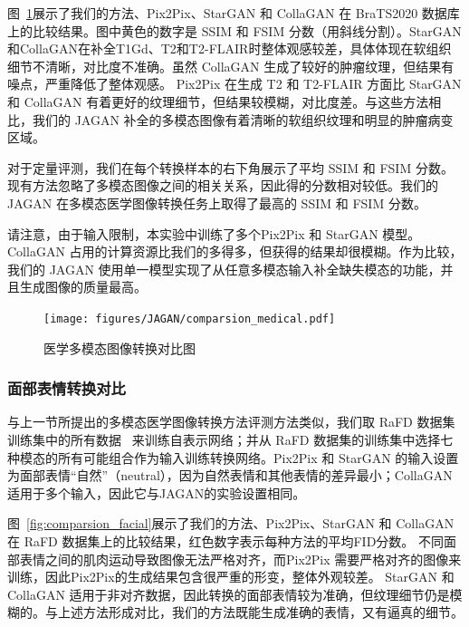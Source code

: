 图~\ref{fig:comparsion_medical}展示了我们的方法、Pix2Pix、StarGAN 和 CollaGAN 在 BraTS2020 数据库上的比较结果。图中黄色的数字是 SSIM 和 FSIM 分数（用斜线分割）。StarGAN和CollaGAN在补全T1Gd、T2和T2-FLAIR时整体观感较差，具体体现在软组织细节不清晰，对比度不准确。虽然 CollaGAN 生成了较好的肿瘤纹理，但结果有噪点，严重降低了整体观感。 Pix2Pix 在生成 T2 和 T2-FLAIR 方面比 StarGAN 和 CollaGAN 有着更好的纹理细节，但结果较模糊，对比度差。与这些方法相比，我们的 JAGAN 补全的多模态图像有着清晰的软组织纹理和明显的肿瘤病变区域。

对于定量评测，我们在每个转换样本的右下角展示了平均 SSIM 和 FSIM 分数。现有方法忽略了多模态图像之间的相关关系，因此得的分数相对较低。我们的 JAGAN 在多模态医学图像转换任务上取得了最高的 SSIM 和 FSIM 分数。

请注意，由于输入限制，本实验中训练了多个Pix2Pix 和 StarGAN 模型。 CollaGAN 占用的计算资源比我们的多得多，但获得的结果却很模糊。作为比较，我们的 JAGAN 使用单一模型实现了从任意多模态输入补全缺失模态的功能，并且生成图像的质量最高。

\begin{figure}
	\begin{center}
		\texttt{[image: figures/JAGAN/comparsion\_medical.pdf]}
	\end{center}
	\caption{医学多模态图像转换对比图}
	\label{fig:comparsion_medical}
\end{figure}

\subsubsection{面部表情转换对比}
与上一节所提出的多模态医学图像转换方法评测方法类似，我们取 RaFD 数据集训练集中的所有数据~\cite{langner2010presentation} 来训练自表示网络；并从 RaFD 数据集的训练集中选择七种模态的所有可能组合作为输入训练转换网络。Pix2Pix 和 StarGAN 的输入设置为面部表情“自然”（neutral），因为自然表情和其他表情的差异最小；CollaGAN 适用于多个输入，因此它与JAGAN的实验设置相同。

图~\ref{fig:comparsion_facial}展示了我们的方法、Pix2Pix、StarGAN 和 CollaGAN 在 RaFD 数据集上的比较结果，红色数字表示每种方法的平均FID分数。 不同面部表情之间的肌肉运动导致图像无法严格对齐，而Pix2Pix 需要严格对齐的图像来训练，因此Pix2Pix的生成结果包含很严重的形变，整体外观较差。 StarGAN 和 CollaGAN 适用于非对齐数据，因此转换的面部表情较为准确，但纹理细节仍是模糊的。与上述方法形成对比，我们的方法既能生成准确的表情，又有逼真的细节。

